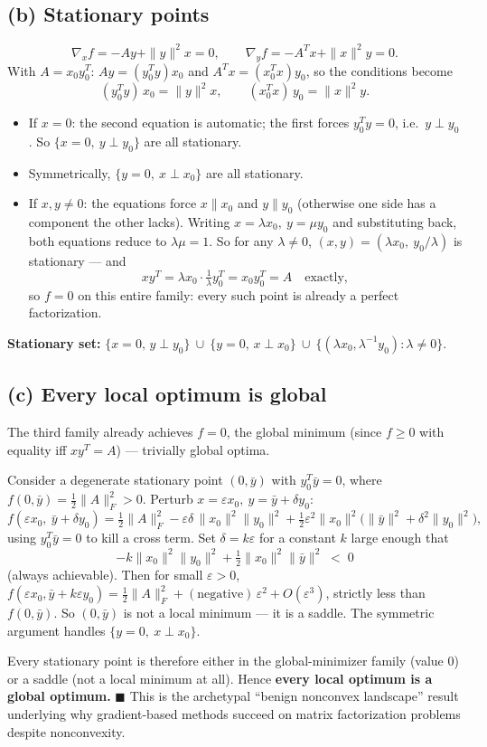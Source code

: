 \documentclass[11pt]{article}
\begin{document}
\subsection*{(b) Stationary points}
\[
\nabla_xf = -Ay+\|y\|^2x = 0, \qquad \nabla_yf = -A^Tx+\|x\|^2y = 0.
\]
With $A=x_0y_0^T$: $Ay=(y_0^Ty)x_0$ and $A^Tx=(x_0^Tx)y_0$, so the conditions become
\[
(y_0^Ty)\,x_0 = \|y\|^2x, \qquad (x_0^Tx)\,y_0 = \|x\|^2y.
\]
\begin{itemize}[leftmargin=1.5em]
\item If $x=0$: the second equation is automatic; the first forces $y_0^Ty=0$, i.e.\ $y\perp y_0$. So $\{x=0,\ y\perp y_0\}$ are all stationary.
\item Symmetrically, $\{y=0,\ x\perp x_0\}$ are all stationary.
\item If $x,y\ne0$: the equations force $x\parallel x_0$ and $y\parallel y_0$ (otherwise one side has a component the other lacks). Writing $x=\lambda x_0,\ y=\mu y_0$ and substituting back, both equations reduce to $\lambda\mu=1$. So for any $\lambda\ne0$, $(x,y)=(\lambda x_0,\ y_0/\lambda)$ is stationary --- and
\[
xy^T = \lambda x_0\cdot\tfrac1\lambda y_0^T = x_0y_0^T = A \quad\text{exactly},
\]
so $f=0$ on this entire family: every such point is already a perfect factorization.
\end{itemize}
\textbf{Stationary set:} $\{x=0,\,y\perp y_0\}\ \cup\ \{y=0,\,x\perp x_0\}\ \cup\ \{(\lambda x_0,\lambda^{-1}y_0): \lambda\ne0\}$.

\subsection*{(c) Every local optimum is global}
The third family already achieves $f=0$, the global minimum (since $f\ge0$ with equality iff $xy^T=A$) --- trivially global optima.

Consider a degenerate stationary point $(0,\bar y)$ with $y_0^T\bar y=0$, where $f(0,\bar y)=\tfrac12\|A\|_F^2>0$. Perturb $x=\varepsilon x_0,\ y=\bar y+\delta y_0$:
\[
f(\varepsilon x_0,\ \bar y+\delta y_0) = \tfrac12\|A\|_F^2 - \varepsilon\delta\,\|x_0\|^2\|y_0\|^2 + \tfrac12\varepsilon^2\|x_0\|^2\big(\|\bar y\|^2+\delta^2\|y_0\|^2\big),
\]
using $y_0^T\bar y=0$ to kill a cross term. Set $\delta = k\varepsilon$ for a constant $k$ large enough that
\[
-k\|x_0\|^2\|y_0\|^2 + \tfrac12\|x_0\|^2\|\bar y\|^2 \;<\; 0
\]
(always achievable). Then for small $\varepsilon>0$, $f(\varepsilon x_0,\bar y+k\varepsilon y_0) = \tfrac12\|A\|_F^2 + (\text{negative})\,\varepsilon^2 + O(\varepsilon^3)$, strictly less than $f(0,\bar y)$. So $(0,\bar y)$ is not a local minimum --- it is a saddle. The symmetric argument handles $\{y=0,\ x\perp x_0\}$.

Every stationary point is therefore either in the global-minimizer family (value $0$) or a saddle (not a local minimum at all). Hence \textbf{every local optimum is a global optimum.} $\blacksquare$ This is the archetypal ``benign nonconvex landscape'' result underlying why gradient-based methods succeed on matrix factorization problems despite nonconvexity.
\end{document}
